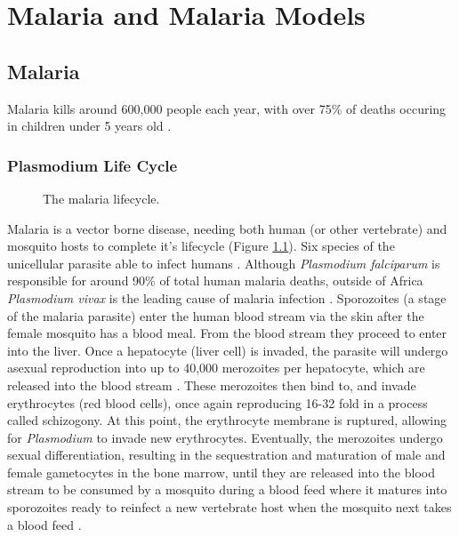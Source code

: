 \chapter{Malaria and Malaria Models}

\section{Malaria}

Malaria kills around 600,000 people each year, with over 75\% of deaths
occuring in children under 5 years old
\parencite{world_health_organization_world_2022}.

\subsection*{Plasmodium Life Cycle}

\begin{figure}[htbp]
    \caption{The malaria lifecycle.}\label{fig:mal_lc}
\end{figure}

Malaria is a vector borne disease, needing both human (or other vertebrate) and
mosquito hosts to complete it's lifecycle (Figure \ref{fig:mal_lc}). Six
species of the unicellular parasite able to infect humans
\parencite{milner_malaria_2018}. Although \textit{Plasmodium falciparum} is
responsible for around 90\% of total human malaria deaths, outside of Africa
\textit{Plasmodium vivax} is the leading cause of malaria infection
\parencite{zekar_plasmodium_2023, adams_biology_2017}. Sporozoites (a stage of
the malaria parasite) enter the human blood stream via the skin after the
female mosquito has a blood meal. From the blood stream they proceed to enter
into the liver. Once a hepatocyte (liver cell) is invaded, the parasite will
undergo asexual reproduction into up to 40,000 merozoites per hepatocyte, which
are released into the blood stream . These merozoites then bind to, and invade
erythrocytes (red blood cells), once again reproducing 16-32 fold in a process
called schizogony. At this point, the erythrocyte membrane is ruptured,
allowing for \textit{Plasmodium} to invade new erythrocytes. Eventually, the
merozoites undergo sexual differentiation, resulting in the sequestration and
maturation of male and female gametocytes in the bone marrow, until they are
released into the blood stream to be consumed by a mosquito during a blood feed
where it matures into sporozoites ready to reinfect a new vertebrate host when
the mosquito next takes a blood feed \parencite{cowman_malaria_2016}.

